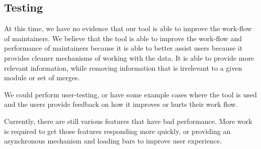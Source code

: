 \documentclass[conference, draftclsnofoot]{IEEEtran}
\begin{document}
\subsection{Testing}
At this time, we have no evidence that our tool is able to improve the
work-flow of maintainers. We believe that the tool is able to improve the
work-flow and performance of maintainers because it is able to better assist
users because it provides cleaner mechanisms of working with the data. It is
able to provide more relevant information, while removing information that is
irrelevant to a given module or set of merges.

We could perform user-testing, or have some example cases where the tool is
used and the users provide feedback on how it improves or hurts their work
flow.



Currently, there are still various features that have bad performance. More
work is required to get those features responding more quickly, or providing an
asynchronous mechanism and loading bars to improve user experience.
\end{document}
